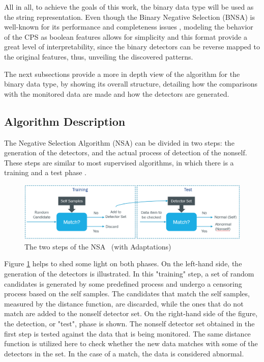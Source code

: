 All in all, to achieve the goals of this work, the binary data type will be used as the string representation. Even though the Binary Negative Selection (BNSA) is well-known for its performance and completeness issues \cite{NSADetGen1996}, modeling the behavior of the CPS as boolean features allows for simplicity and this format provide a great level of interpretability, since the binary detectors can be reverse mapped to the original features, thus, unveiling the discovered patterns.

The next subsections provide a more in depth view of the algorithm for the binary data type, by showing its overall structure, detailing how the comparisons with the monitored data are made and how the detectors are generated. 


\subsection{Algorithm Description} \label{sec:bgNSAOverview}

The Negative Selection Algorithm (NSA) can be divided in two steps: the generation of the detectors, and the actual process of detection of the nonself. These steps are similar to most supervised algorithms, in which there is a training and a test phase \cite{NSAResearch2021}. 

\begin{figure}[!h]
	\centering
	\includegraphics[width=\textwidth, keepaspectratio]{img/NSA.png}
	\caption{The two steps of the NSA~ \cite{NSAResearch2021} (with Adaptations) }
	\label{fig:NSAOverview}
\end{figure}


Figure \ref{fig:NSAOverview} helps to shed some light on both phases. On the left-hand side, the generation of the detectors is illustrated. In this "training" step, a set of random candidates is generated by some predefined process and undergo a censoring process based on the self samples. The candidates that match the self samples, measured by the distance function, are discarded, while the ones that do not match are added to the nonself detector set. On the right-hand side of the figure, the detection, or "test", phase is shown. The nonself detector set obtained in the first step is tested against the data that is being monitored. The same distance function is utilized here to check whether the new data matches with some of the detectors in the set. In the case of a match, the data is considered abnormal.

